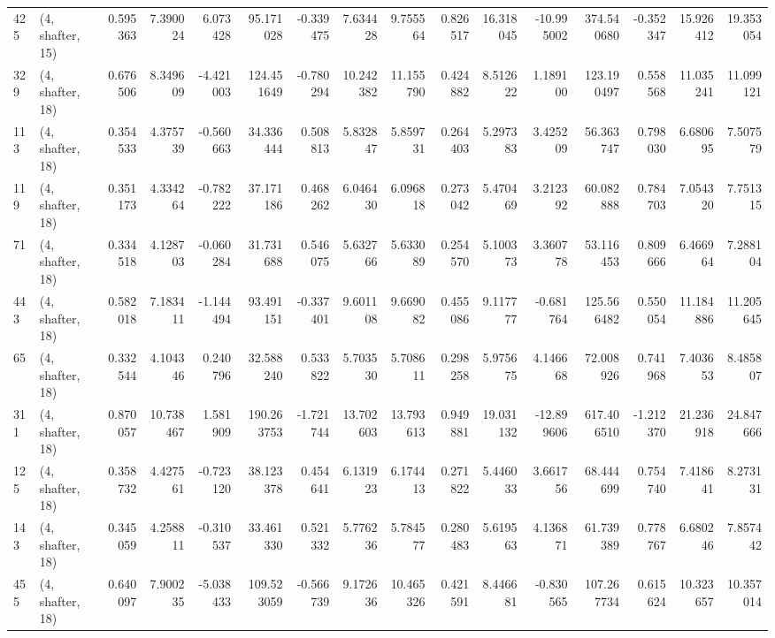\begin{tabular}{llrrrrrrrrrrrrrr}
425 &  (4, shafter, 15) &   0.595363 &   7.390024 &   6.073428 &    95.171028 &  -0.339475 &   7.634428 &   9.755564 &  0.826517 &  16.318045 & -10.995002 &   374.540680 & -0.352347 &  15.926412 &  19.353054 \\
329 &  (4, shafter, 18) &   0.676506 &   8.349609 &  -4.421003 &   124.451649 &  -0.780294 &  10.242382 &  11.155790 &  0.424882 &   8.512622 &   1.189100 &   123.190497 &  0.558568 &  11.035241 &  11.099121 \\
113 &  (4, shafter, 18) &   0.354533 &   4.375739 &  -0.560663 &    34.336444 &   0.508813 &   5.832847 &   5.859731 &  0.264403 &   5.297383 &   3.425209 &    56.363747 &  0.798030 &   6.680695 &   7.507579 \\
119 &  (4, shafter, 18) &   0.351173 &   4.334264 &  -0.782222 &    37.171186 &   0.468262 &   6.046430 &   6.096818 &  0.273042 &   5.470469 &   3.212392 &    60.082888 &  0.784703 &   7.054320 &   7.751315 \\
71  &  (4, shafter, 18) &   0.334518 &   4.128703 &  -0.060284 &    31.731688 &   0.546075 &   5.632766 &   5.633089 &  0.254570 &   5.100373 &   3.360778 &    53.116453 &  0.809666 &   6.466964 &   7.288104 \\
443 &  (4, shafter, 18) &   0.582018 &   7.183411 &  -1.144494 &    93.491151 &  -0.337401 &   9.601108 &   9.669082 &  0.455086 &   9.117777 &  -0.681764 &   125.566482 &  0.550054 &  11.184886 &  11.205645 \\
65  &  (4, shafter, 18) &   0.332544 &   4.104346 &   0.240796 &    32.588240 &   0.533822 &   5.703530 &   5.708611 &  0.298258 &   5.975675 &   4.146668 &    72.008926 &  0.741968 &   7.403653 &   8.485807 \\
311 &  (4, shafter, 18) &   0.870057 &  10.738467 &   1.581909 &   190.263753 &  -1.721744 &  13.702603 &  13.793613 &  0.949881 &  19.031132 & -12.899606 &   617.406510 & -1.212370 &  21.236918 &  24.847666 \\
125 &  (4, shafter, 18) &   0.358732 &   4.427561 &  -0.723120 &    38.123378 &   0.454641 &   6.131923 &   6.174413 &  0.271822 &   5.446033 &   3.661756 &    68.444699 &  0.754740 &   7.418641 &   8.273131 \\
143 &  (4, shafter, 18) &   0.345059 &   4.258811 &  -0.310537 &    33.461330 &   0.521332 &   5.776236 &   5.784577 &  0.280483 &   5.619563 &   4.136871 &    61.739389 &  0.778767 &   6.680246 &   7.857442 \\
455 &  (4, shafter, 18) &   0.640097 &   7.900235 &  -5.038433 &   109.523059 &  -0.566739 &   9.172636 &  10.465326 &  0.421591 &   8.446681 &  -0.830565 &   107.267734 &  0.615624 &  10.323657 &  10.357014 \\

\end{tabular}
